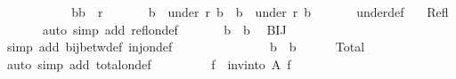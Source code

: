 \begin{isabellebody}
\isanewline
\ \ \ \ \isamarkupfalse%
\isanewline
\ \ \ \ \ \isacommand{{\isacharbraceleft}{\kern0pt}}\isamarkupfalse%
\isamarkupfalse%
\ {\isachardoublequoteopen}{\isacharparenleft}{\kern0pt}b{}{\isacharcomma}{\kern0pt}b{}{\isacharparenright}{\kern0pt}\ {\isasymin}\ r{\isachardoublequoteclose}\isanewline
\ \ \ \ \ \isamarkupfalse%
\ {\isachardoublequoteopen}b{}\ {\isasymin}\ under\ r\ b{}\ {\isasymand}\ b{}\ {\isasymin}\ under\ r\ b{}{\isachardoublequoteclose}\isanewline
\ \ \ \ \ \isamarkupfalse%
\ under{\isacharunderscore}{\kern0pt}def\ \isamarkupfalse%
\ {}{}\ Refl\isanewline
\ \ \ \ \ \isamarkupfalse%
\ {\isacharparenleft}{\kern0pt}auto\ simp\ add{\isacharcolon}{\kern0pt}\ refl{\isacharunderscore}{\kern0pt}on{\isacharunderscore}{\kern0pt}def{\isacharparenright}{\kern0pt}\isanewline
\ \ \ \ \ \isamarkupfalse%
\ {\isachardoublequoteopen}b{}\ {\isacharequal}{\kern0pt}\ b{}{\isachardoublequoteclose}\ \isamarkupfalse%
\ BIJ\ {\isacharasterisk}{\kern0pt}\ {\isacharasterisk}{\kern0pt}{\isacharasterisk}{\kern0pt}\ {\isacharasterisk}{\kern0pt}{\isacharasterisk}{\kern0pt}{\isacharasterisk}{\kern0pt}\isanewline
\ \ \ \ \ \isamarkupfalse%
\ {\isacharparenleft}{\kern0pt}simp\ add{\isacharcolon}{\kern0pt}\ bij{\isacharunderscore}{\kern0pt}betw{\isacharunderscore}{\kern0pt}def\ inj{\isacharunderscore}{\kern0pt}on{\isacharunderscore}{\kern0pt}def{\isacharparenright}{\kern0pt}\isanewline
\ \ \ \ \isacommand{{\isacharbraceright}{\kern0pt}}\isamarkupfalse%
\isanewline
\ \ \ \ \isamarkupfalse%
\isanewline
\ \ \ \ \isamarkupfalse%
\ {\isachardoublequoteopen}b{}\ {\isacharequal}{\kern0pt}\ b{}{\isachardoublequoteclose}\isanewline
\ \ \ \ \isamarkupfalse%
\ Total\ \isamarkupfalse%
\ {\isacharparenleft}{\kern0pt}auto\ simp\ add{\isacharcolon}{\kern0pt}\ total{\isacharunderscore}{\kern0pt}on{\isacharunderscore}{\kern0pt}def{\isacharparenright}{\kern0pt}\isanewline
\ \ \isamarkupfalse%
\isanewline
\ \ \isanewline
\ \ \isamarkupfalse%
\ {\isacharquery}{\kern0pt}f{\isacharprime}{\kern0pt}\ {\isacharequal}{\kern0pt}\ {\isachardoublequoteopen}{\isacharparenleft}{\kern0pt}inv{\isacharunderscore}{\kern0pt}into\ A\ f{\isacharparenright}{\kern0pt}{\isachardoublequoteclose}\isanewline

\end{isabellebody}

